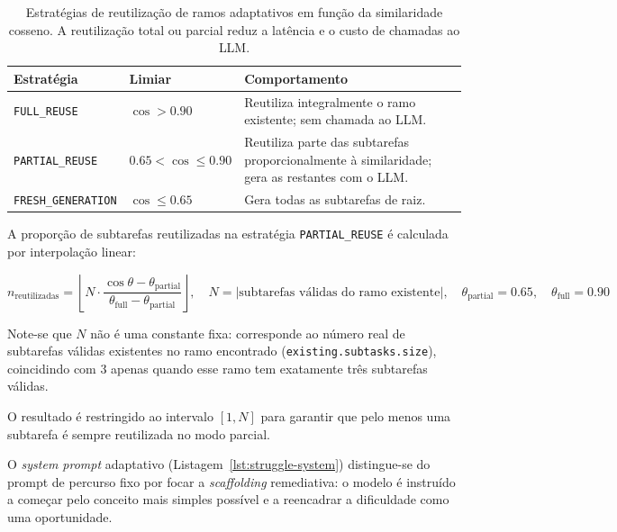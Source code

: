 \begin{table}[htbp]
	\centering
	\small
	\begin{tabular}{p{3.2cm} p{3.0cm} p{5.9cm}}
		\toprule
		\textbf{Estrat\'egia} & \textbf{Limiar} & \textbf{Comportamento} \\
		\midrule
		\texttt{FULL\_REUSE} &
			$\cos > 0.90$ &
			Reutiliza integralmente o ramo existente; sem chamada ao LLM. \\
		\texttt{PARTIAL\_REUSE} &
			$0.65 < \cos \leq 0.90$ &
			Reutiliza parte das subtarefas proporcionalmente \`a similaridade;
			gera as restantes com o LLM. \\
		\texttt{FRESH\_GENERATION} &
			$\cos \leq 0.65$ &
			Gera todas as subtarefas de raiz. \\
		\bottomrule
	\end{tabular}
	\caption[Estrat\'egias de reutiliza\c{c}\~ao na gera\c{c}\~ao adaptativa]{Estrat\'egias de reutiliza\c{c}\~ao de ramos adaptativos em fun\c{c}\~ao da similaridade cosseno. A reutiliza\c{c}\~ao total ou parcial reduz a lat\^encia e o custo de chamadas ao LLM.}
	\label{tab:reuse-strategy}
\end{table}

A propor\c{c}\~ao de subtarefas reutilizadas na estrat\'egia
\texttt{PARTIAL\_REUSE} \'e calculada por interpola\c{c}\~ao linear:

\begin{equation}
	n_{\text{reutilizadas}} = \left\lfloor
		N \cdot \frac{\cos\theta - \theta_{\text{partial}}}{\theta_{\text{full}} - \theta_{\text{partial}}}
	\right\rfloor, \quad
	N = |\text{subtarefas v\'alidas do ramo existente}|,\quad
	\theta_{\text{partial}} = 0.65,\quad
	\theta_{\text{full}} = 0.90
	\label{eq:partial-reuse}
\end{equation}

\noindent Note-se que $N$ n\~ao \'e uma constante fixa: corresponde ao
n\'umero real de subtarefas v\'alidas existentes no ramo encontrado
(\texttt{existing.subtasks.size}), coincidindo com 3 apenas quando esse
ramo tem exatamente tr\^es subtarefas v\'alidas.

O resultado \'e restringido ao intervalo $[1, N]$ para garantir que pelo menos
uma subtarefa \'e sempre reutilizada no modo parcial.

\begin{sloppypar}
O \emph{system prompt} adaptativo (Listagem~\ref{lst:struggle-system})
distingue-se do prompt de percurso fixo por focar a \emph{scaffolding}
remediativa: o modelo \'e instru\'ido a come\c{c}ar pelo conceito mais
simples poss\'ivel e a reencadrar a dificuldade como uma oportunidade.
\end{sloppypar}

